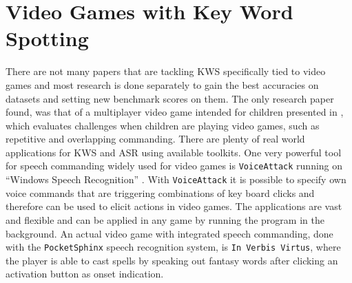 
\section{Video Games with Key Word Spotting}\label{sec:prev_kws_games}
\thesisStateRevised
There are not many papers that are tackling KWS specifically tied to video games and most research is done separately to gain the best accuracies on datasets and setting new benchmark scores on them.
The only research paper found, was that of a multiplayer video game intended for children presented in \cite{Harshavardhan2015}, which evaluates challenges when children are playing video games, such as repetitive and overlapping commanding.
There are plenty of real world applications for KWS and ASR using available toolkits.
One very powerful tool for speech commanding widely used for video games is \texttt{VoiceAttack} running on \enquote{Windows Speech Recognition} \cite{Xiong2017}.
With \texttt{VoiceAttack} it is possible to specify own voice commands that are triggering combinations of key board clicks and therefore can be used to elicit actions in video games.
The applications are vast and flexible and can be applied in any game by running the program in the background.
An actual video game with integrated speech commanding, done with the \texttt{PocketSphinx} \cite{Huggins2006} speech recognition system, is \texttt{In Verbis Virtus}, where the player is able to cast spells by speaking out fantasy words after clicking an activation button as onset indication.